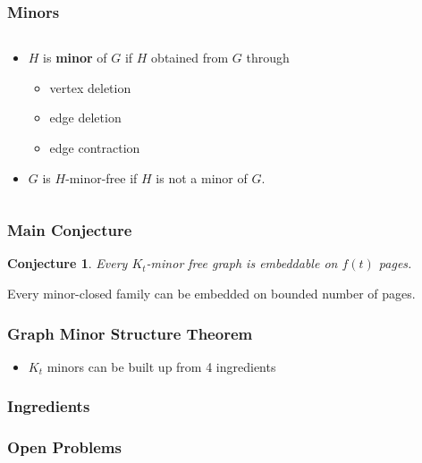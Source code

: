 \documentclass{beamer}
\newtheorem{conjecture}[theorem]{Conjecture}
\begin{document}
\begin{frame}
    \frametitle{Minors}
    \begin{columns}
      \begin{column}{0.5\textwidth}
          \begin{itemize}
            \item $H$ is \textbf{minor} of $G$ if $H$ obtained from $G$ through \begin{itemize}
              \item vertex deletion
              \item edge deletion
              \item edge contraction
            \end{itemize}
            \item $G$ is $H$-minor-free if $H$ is not a minor of $G$. 
          \end{itemize}    
      \end{column}
        \begin{column}{0.5\textwidth}
          \begin{figure}
            \centering
            
          \end{figure}
      \end{column}
    \end{columns}
\end{frame}

\begin{frame}
  \frametitle{Main Conjecture}
  \begin{conjecture}
  Every $K_t$-minor free graph is embeddable on $f(t)$ pages.
  \end{conjecture}
  \begin{corollary}
    Every minor-closed family can be embedded on bounded number of pages.
  \end{corollary}

\end{frame}

\begin{frame}
    \frametitle{Graph Minor Structure Theorem}
    \begin{itemize}
      \item $K_t$ minors can be built up from 4 ingredients
    \end{itemize}
\end{frame}

\begin{frame}
  \frametitle{Ingredients}
\end{frame}

\begin{frame}
  \frametitle{Open Problems}
\end{frame}
\end{document}
